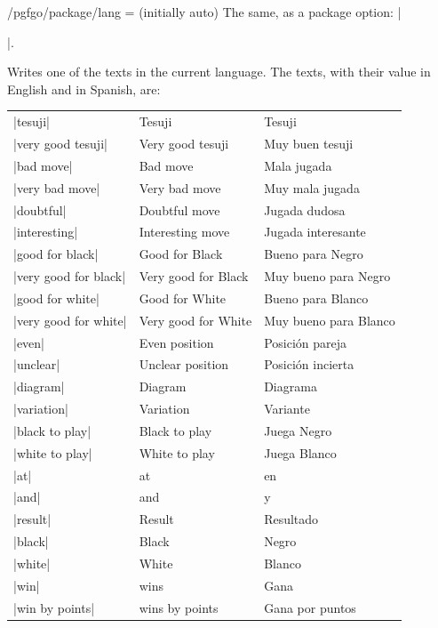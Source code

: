 \begin{goban}[9, stone = {radius = 4pt}, mark = {line = {color = red}}]
\begin{key}{/pgfgo/package/lang =  (initially auto)}
	The same, as a package option: |\usepackage[lang = fr]{pgf-go}|.
\end{key}

\begin{command}{\pgfgotext{}}
	Writes one of the texts in the current language. The texts, with their value in English and in Spanish, are:

	\begin{center}
		\small
		\begin{tabular}{lll}
			|tesuji| & Tesuji & Tesuji \\
			|very good tesuji| & Very good tesuji & Muy buen tesuji \\
			|bad move| & Bad move & Mala jugada \\
			|very bad move| & Very bad move & Muy mala jugada \\
			|doubtful| & Doubtful move & Jugada dudosa \\
			|interesting| & Interesting move & Jugada interesante \\
			|good for black| & Good for Black & Bueno para Negro \\
			|very good for black| & Very good for Black & Muy bueno para Negro \\
			|good for white| & Good for White & Bueno para Blanco \\
			|very good for white| & Very good for White & Muy bueno para Blanco \\
			|even| & Even position & Posición pareja \\
			|unclear| & Unclear position & Posición incierta \\
			|diagram| & Diagram & Diagrama \\
			|variation| & Variation & Variante \\
			|black to play| & Black to play & Juega Negro \\
			|white to play| & White to play & Juega Blanco \\
			|at| & at & en \\
			|and| & and & y \\
			|result| & Result & Resultado \\
			|black| & Black & Negro \\
			|white| & White & Blanco \\
			|win| & \meta{winner} wins & Gana \meta{winner} \\
			|win by points| & \meta{winner} wins by \meta{points} points & Gana \meta{winner} por \meta{points} puntos \\

\end{tabular}
\end{center}
\end{command}
\end{goban}
